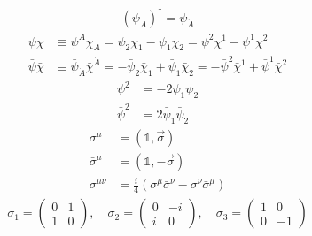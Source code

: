 \documentclass[a4paper]{article}
\newcommand{\pclosed}[1]{\left(#1\right)}
\newcommand{\eye}{\mathds{1}}
\begin{document}
\begin{multicols}{3}
\begin{align*}
        \end{align*}
        \begin{align*}
            \pclosed{\psi_A}^\dagger = \bar{\psi}_{\dot{A}}
        \end{align*}
        \begin{align*}
            \psi \chi             & \equiv \psi^A \chi_A
            = \psi_2\chi_1 - \psi_1\chi_2
            = \psi^2\chi^1 - \psi^1\chi^2                                            \\
            \bar{\psi} \bar{\chi} & \equiv \bar{\psi}_{\dot{A}} \bar{\chi}^{\dot{A}}
            = -\bar{\psi}_2\bar{\chi}_1 + \bar{\psi}_1\bar{\chi}_2
            = -\bar{\psi}^2\bar{\chi}^1 + \bar{\psi}^1\bar{\chi}^2
        \end{align*}
        \begin{align*}
            \psi^2       & = -2\psi_1\psi_2            \\
            \bar{\psi}^2 & = 2\bar{\psi}_1\bar{\psi}_2
        \end{align*}
        \begin{align*}
            \sigma^\mu       & = \pclosed{\eye, \vec{\sigma}}                                          \\
            \bar{\sigma}^\mu & = \pclosed{\eye, -\vec{\sigma}}                                         \\
            \sigma^{\mu\nu}  & = \frac{i}{4}(\sigma^\mu \bar{\sigma}^\nu - \sigma^\nu\bar{\sigma}^\mu)
        \end{align*}
        \begin{align*}
            \sigma_1 = \begin{pmatrix} 0 & 1 \\ 1 & 0 \end{pmatrix},\quad
            \sigma_2 = \begin{pmatrix} 0 & -i \\ i & 0 \end{pmatrix},\quad
            \sigma_3 = \begin{pmatrix} 1 & 0 \\ 0 & -1 \end{pmatrix}
        \end{align*}


\end{multicols}
\end{document}
